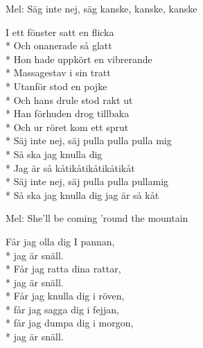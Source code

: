 \begin{SongText}
    \begin{SongInfo}
        Mel: Säg inte nej, säg kanske, kanske, kanske
    \end{SongInfo}
    \begin{SongVerse}
        I ett fönster satt en flicka\\*%
        Och onanerade så glatt\\*%
        Hon hade uppkört en vibrerande\\*%
        Massagestav i sin tratt\\*%
        Utanför stod en pojke\\*%
        Och hans drule stod rakt ut\\*%
        Han förhuden drog tillbaka\\*%
        Och ur röret kom ett sprut\\*%
        Säj inte nej, säj pulla pulla pulla mig\\*%
        Så ska jag knulla dig\\*%
        Jag är så kåtikåtikåtikåtikåt\\*%
        Säj inte nej, säj pulla pulla pullamig\\*%
        Så ska jag knulla dig jag är så kåt
    \end{SongVerse}
\end{SongText}
\begin{SongText}
    \begin{SongInfo}
        Mel: She’ll be coming ’round the mountain
    \end{SongInfo}
    \begin{SongVerse}
        Får jag olla dig I pannan,\\*%
        jag är snäll.\\*%
        Får jag ratta dina rattar,\\*%
        jag är snäll.\\*%
        Får jag knulla dig i röven,\\*%
        får jag sagga dig i fejjan,\\*%
        får jag dumpa dig i morgon,\\*%
        jag är snäll.
    \end{SongVerse}
\end{SongText}
